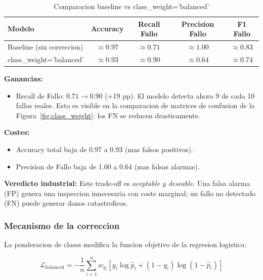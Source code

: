 \documentclass[12pt,a4paper]{article}
\begin{document}
\begin{table}[H]
  \centering
  \caption{Comparacion baseline vs class\_weight='balanced'}
  \label{tab:class_weight}
  \begin{tabular}{lcccc}
    \toprule
    \textbf{Modelo} & \textbf{Accuracy} & \textbf{Recall Fallo} & \textbf{Precision Fallo} & \textbf{F1 Fallo} \\
    \midrule
    Baseline (sin correccion)  & $\approx 0.97$ & $\approx 0.71$ & $\approx 1.00$ & $\approx 0.83$ \\
    class\_weight='balanced'   & $\approx 0.93$ & $\approx 0.90$ & $\approx 0.64$ & $\approx 0.74$ \\
    \bottomrule
  \end{tabular}
\end{table}

\begin{tcolorbox}[resultbox, title={Analisis del trade-off}]
  \textbf{Ganancias:}
  \begin{itemize}
    \item Recall de Fallo: $0.71 \to 0.90$ (+19 pp). El modelo detecta ahora 9 de cada 10
      fallos reales. Esto es visible en la comparacion de matrices de confusion de la
      Figura~\ref{fig:class_weight}: los FN se reducen drasticamente.
  \end{itemize}
  \textbf{Costes:}
  \begin{itemize}
    \item Accuracy total baja de 0.97 a 0.93 (mas falsos positivos).
    \item Precision de Fallo baja de 1.00 a 0.64 (mas falsas alarmas).
  \end{itemize}
  \textbf{Veredicto industrial:} Este trade-off es \textit{aceptable y deseable}. Una falsa
  alarma (FP) genera una inspeccion innecesaria con coste marginal; un fallo no detectado (FN)
  puede generar danos catastroficos.
\end{tcolorbox}

\subsubsection*{Mecanismo de la correccion}

La ponderacion de clases modifica la funcion objetivo de la regresion logistica:

\begin{equation}
  \mathcal{L}_{\text{balanced}} = -\frac{1}{n}\sum_{i=1}^{n} w_{y_i} \left[ y_i \log\hat{p}_i + (1-y_i)\log(1-\hat{p}_i) \right]
  \label{eq:weighted_loss}
\end{equation}
\end{document}
